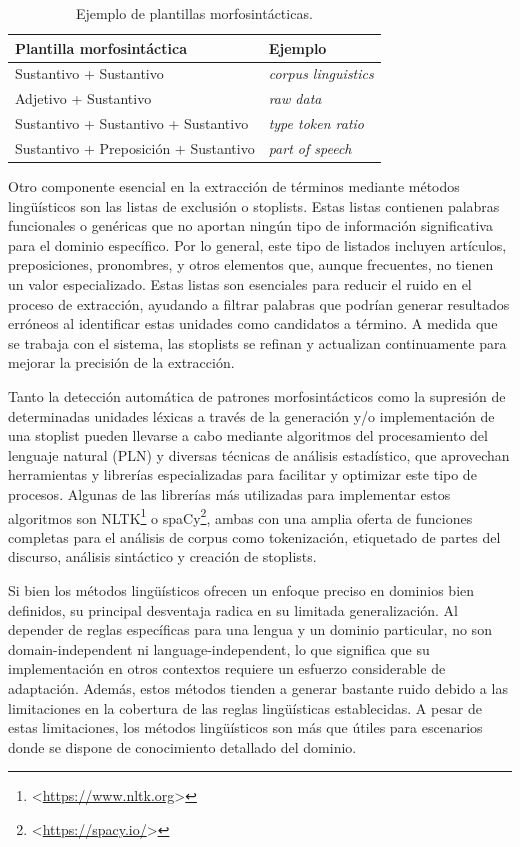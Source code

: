 \begin{table}[H]
\centering
\begin{tabular}{@{}p{7cm}p{4cm}@{}}
\toprule
\textbf{Plantilla morfosintáctica} & \textbf{Ejemplo} \\
\midrule
Sustantivo + Sustantivo & \textit{corpus linguistics} \\
Adjetivo + Sustantivo & \textit{raw data} \\
Sustantivo + Sustantivo + Sustantivo & \textit{type token ratio} \\
Sustantivo + Preposición + Sustantivo & \textit{part of speech} \\
\bottomrule
\end{tabular}
\caption{Ejemplo de plantillas morfosintácticas.}
\label{tab:plantillas-morfosintacticas}
\end{table}

Otro componente esencial en la extracción de términos mediante métodos lingüísticos son las listas de exclusión o stoplists. Estas listas contienen palabras funcionales o genéricas que no aportan ningún tipo de información significativa para el dominio específico. Por lo general, este tipo de listados incluyen artículos, preposiciones, pronombres, y otros elementos que, aunque frecuentes, no tienen un valor especializado. Estas listas son esenciales para reducir el ruido en el proceso de extracción, ayudando a filtrar palabras que podrían generar resultados erróneos al identificar estas unidades como candidatos a término. A medida que se trabaja con el sistema, las stoplists se refinan y actualizan continuamente para mejorar la precisión de la extracción.

Tanto la detección automática de patrones morfosintácticos como la supresión de determinadas unidades léxicas a través de la generación y/o implementación de una stoplist pueden llevarse a cabo mediante algoritmos del procesamiento del lenguaje natural (PLN) y diversas técnicas de análisis estadístico, que aprovechan herramientas y librerías especializadas para facilitar y optimizar este tipo de procesos. Algunas de las librerías más utilizadas para implementar estos algoritmos son NLTK\footnote{<\hyperlink{https://www.nltk.org/}{https://www.nltk.org}>} o spaCy\footnote{<\hyperlink{https://spacy.io/}{https://spacy.io/}>}, ambas con una amplia oferta de funciones completas para el análisis de corpus como tokenización, etiquetado de partes del discurso, análisis sintáctico y creación de stoplists.

Si bien los métodos lingüísticos ofrecen un enfoque preciso en dominios bien definidos, su principal desventaja radica en su limitada generalización. Al depender de reglas específicas para una lengua y un dominio particular, no son domain-independent ni language-independent, lo que significa que su implementación en otros contextos requiere un esfuerzo considerable de adaptación. Además, estos métodos tienden a generar bastante ruido debido a las limitaciones en la cobertura de las reglas lingüísticas establecidas. A pesar de estas limitaciones, los métodos lingüísticos son más que útiles para escenarios donde se dispone de conocimiento detallado del dominio.

